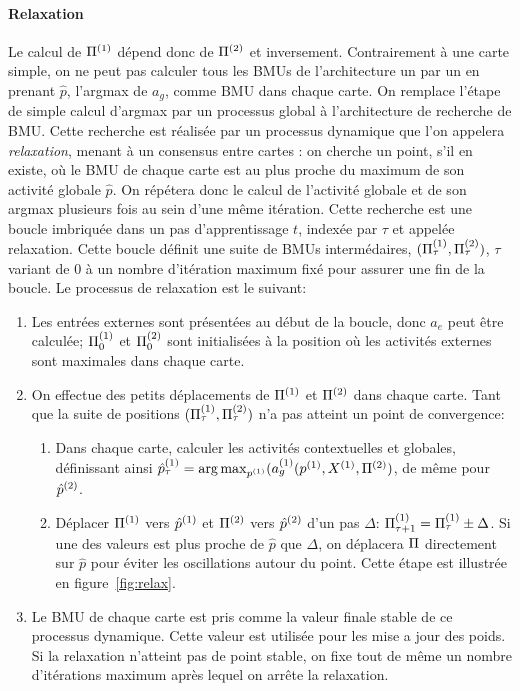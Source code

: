 \paragraph{Relaxation}
Le calcul de $\Pi^{({1})}$ dépend donc de $\Pi^{({2})}$ et inversement. Contrairement à une carte simple, on ne peut pas calculer tous les BMUs de l'architecture un par un en prenant $\hat{p}$, l'argmax de $a_g$, comme BMU dans chaque carte.
On remplace l'étape de simple calcul d'argmax par un processus global à l'architecture de recherche de BMU. Cette recherche est réalisée par un processus dynamique que l'on appelera \emph{relaxation}, menant à un consensus entre cartes : on cherche un point, s'il en existe, où le BMU de chaque carte est au plus proche du maximum de son activité globale $\hat{p}$. On répétera donc le calcul de l'activité globale et de son argmax plusieurs fois au sein d'une même itération.
Cette recherche est une boucle imbriquée dans un pas d'apprentissage $t$, indexée par $\tau$ et appelée relaxation. Cette boucle définit une suite de BMUs intermédaires, $(\Pi^{({1})}_\tau , \Pi^{({2})}_\tau)$, $\tau$ variant de $0$ à un nombre d'itération maximum fixé pour assurer une fin de la boucle. Le processus de relaxation est le suivant:
\begin{enumerate}
\item Les entrées externes sont présentées au début de la boucle, donc $a_e$ peut être calculée; $\Pi^{({1})}_0$ et $\Pi^{({2})}_0$ sont initialisées à la position où les activités externes sont maximales dans chaque carte. 
\item On effectue des petits déplacements de $\Pi^{({1})}$ et $\Pi^{({2})}$ dans chaque carte. Tant que la suite de positions $(\Pi^{({1})}_\tau,\Pi^{({2})}_\tau)$ n'a pas atteint un point de convergence:
	\begin{enumerate}
	\item Dans chaque carte, calculer les activités contextuelles et globales, définissant ainsi $\hat{p}^{({1})}_\tau = \operatorname*{arg\,max}_{p^{({1})}}(a_g^{({1})}(p^{({1})},X^{({1})}, \Pi^{({2})})$, de même pour $\hat{p}^{({2})}$.
	\item Déplacer $\Pi^{({1})}$ vers $\hat{p}^{({1})}$ et $\Pi^{({2})}$ vers $\hat{p}^{({2})}$ d'un pas $\Delta$: $\Pi^{({1})}_{\tau+1} = \Pi^{({1})}_{\tau} \pm \Delta$.
	Si une des valeurs est plus proche de $\hat{p}$ que $\Delta$, on déplacera $\Pi$ directement sur $\hat{p}$ pour éviter les oscillations autour du point. Cette étape est illustrée en figure~\ref{fig:relax}.
	\end{enumerate}
\item Le BMU de chaque carte est pris comme la valeur finale stable de ce processus dynamique. Cette valeur est utilisée pour les mise a jour des poids. Si la relaxation n'atteint pas de point stable, on fixe tout de même un nombre d'itérations maximum après lequel on arrête la relaxation.
\end{enumerate}
